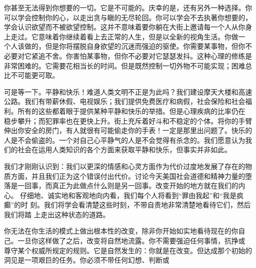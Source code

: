 你甚至无法得到你想要的一切。它是不可能的。庆幸的是，还有另外一种选择。你
可以学会控制你的心，以走出贪与瞋的无尽轮回。你可以学会不去执著你想要的，
学会认识欲望而不被欲望控制。这并不意味着要你躺在大街上邀请每一个人从你身
上走过。它意味着你继续着看上去正常的人生，但是以全新的视角生活。你做\1一
个人该做的，但是你将摆脱自身欲望的沉迷而强迫的驱使。你需要某事物，但你不
必要对它紧追不舍。你害怕某事物，但你不必要对它瑟瑟发抖。这种心理的修练是
非常困难的。它需要花相当长的时间。但是既然控制一切外物不可能实现；困难总
比不可能更可取。

可是等一下。平静和快乐！难道人类文明不正是为此吗？我们建设摩天大楼和高速
公路。我们有带薪休假、电视娱乐；我们提供免费医疗和病假，社会保险和社会福
利。所有的这些都着眼于提供某种平静和快乐的举措。但是心理疾病的比率仍在
稳步攀升；而犯罪率也在更快上升。街上充斥着好斗和不稳定的个体。将你的手臂
伸出你安全的房门，有人就很有可能偷走你的手表！一定是那里出问题了。快乐的
人是不会偷盗的。一个对自己心平静气的人是不会觉得有杀念的。我们愿意认为我
们的社会在运用人类知识的各个方面来获取平静和快乐，但事实并非如此。

我们才刚刚认识到：我们以更深的情感和心灵方面作为代价过度地发展了存在的物
质方面，并且我们正为这个错误付出代价。讨论今天美国社会道德和精神力量的堕
落是一回事，而真正为此做点什么则是另一回事。改变开始的地方就在我们的内心。
仔细地、诚实地和客观地向内看，我们每个人将看到“罪由我起”和“我是疯癫”的时
刻。我们将学会看清楚这些时刻，不带自责地非常清楚地看待它们，然后我们将踏
上走出这种状态的道路。

你无法在你生活的模式上做出根本性的改变，除非你开始如实地看待现在的你自
己。一旦你这样做了之后，\1改变将自然地流露。你不需要强迫任何事情，抗挣或
尊守某个权威所规定的规则。它是自然发生的：你就是在改变。但达成那个初始的
洞见是一项艰巨的任务。你必须不带任何幻想、判断或

\endchapter

\vfill\eject\byebye
